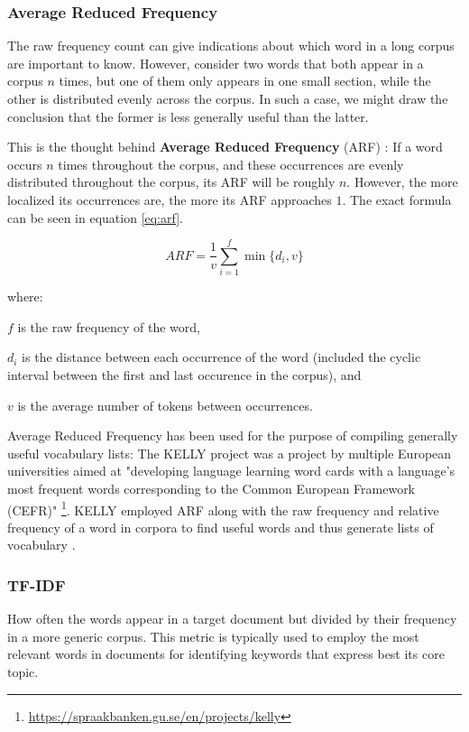 \subsubsection {Average Reduced Frequency}
The raw frequency count can give indications about which word in a long corpus are important to know.
However, consider two words that both appear in a corpus $n$ times, but one of them only appears in one small section, while the other is distributed evenly across the corpus.
In such a case, we might draw the conclusion that the former is less generally useful than the latter.

This is the thought behind \textbf{Average Reduced Frequency} (ARF) \cite{savickyMeasuresWordCommonness2002}:
If a word occurs $n$ times throughout the corpus, and these occurrences are evenly distributed throughout the corpus, its ARF will be roughly $n$.
However, the more localized its occurrences are, the more its ARF approaches $1$.
The exact formula can be seen in equation \ref{eq:arf}.

\begin{equation}\label{eq:arf}
	ARF = \frac{1}{v}\sum_{i=1}^{f} \min\{d_i,v\}
\end{equation}

where:

$f$ is the raw frequency of the word,

$d_i$ is the distance between each occurrence of the word (included the cyclic interval between the first and last occurence in the corpus), and

$v$ is the average number of tokens between occurrences.

Average Reduced Frequency has been used for the purpose of compiling generally useful vocabulary lists:
The KELLY project was a project by multiple European universities aimed at "developing language learning word cards with a language's most frequent words corresponding to the Common European Framework (CEFR)" \footnote{\url{https://spraakbanken.gu.se/en/projects/kelly}}.
KELLY employed ARF along with the raw frequency and relative frequency of a word in corpora to find useful words and thus generate lists of vocabulary \cite{kokkinakisCorpusbasedApproachesCreation2011}.

\subsubsection {TF-IDF}
How often the words appear in a target document but divided by their frequency in a more generic corpus.
This metric is typically used to employ the most relevant words in documents for identifying keywords that express best its core topic.


